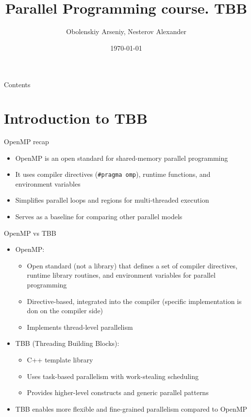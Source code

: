 \documentclass{beamer}
\title[Parallel Programming. TBB]{Parallel Programming course. TBB}
\author{Obolenskiy Arseniy, Nesterov Alexander}
\institute{Nizhny Novgorod State University}
\date{\today} %
\begin{document}
\begin{frame}
  \titlepage
\end{frame}

\begin{frame}{Contents}
  \tableofcontents
\end{frame}

\section{Introduction to TBB}
\begin{frame}{OpenMP recap}
  \begin{itemize}
    \item OpenMP is an open standard for shared-memory parallel programming
    \item It uses compiler directives (\texttt{\#pragma omp}), runtime functions, and environment variables
    \item Simplifies parallel loops and regions for multi-threaded execution
    \item Serves as a baseline for comparing other parallel models
  \end{itemize}
\end{frame}

\begin{frame}{OpenMP vs TBB}
  \begin{itemize}
    \item OpenMP:
      \begin{itemize}
        \item Open standard (not a library) that defines a set of compiler directives, runtime library routines, and environment variables for parallel programming
        \item Directive-based, integrated into the compiler (specific implementation is don on the compiler side)
        \item Implements thread-level parallelism
      \end{itemize}
    \item TBB (Threading Building Blocks):
      \begin{itemize}
        \item C++ template library
        \item Uses task-based parallelism with work-stealing scheduling
        \item Provides higher-level constructs and generic parallel patterns
      \end{itemize}
    \item TBB enables more flexible and fine-grained parallelism compared to OpenMP
  \end{itemize}
\end{frame}
\end{document}
